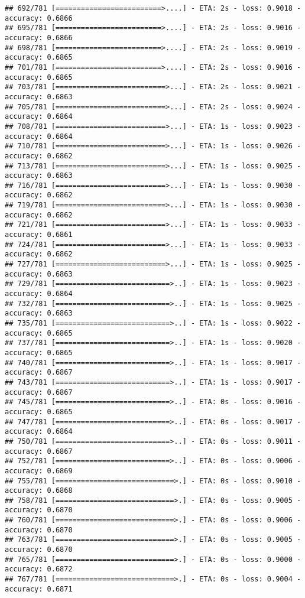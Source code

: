 \documentclass[
]{article}
\begin{document}
\begin{verbatim}
## 692/781 [=========================>....] - ETA: 2s - loss: 0.9018 - accuracy: 0.6866
## 695/781 [=========================>....] - ETA: 2s - loss: 0.9016 - accuracy: 0.6866
## 698/781 [=========================>....] - ETA: 2s - loss: 0.9019 - accuracy: 0.6865
## 701/781 [=========================>....] - ETA: 2s - loss: 0.9016 - accuracy: 0.6865
## 703/781 [==========================>...] - ETA: 2s - loss: 0.9021 - accuracy: 0.6863
## 705/781 [==========================>...] - ETA: 2s - loss: 0.9024 - accuracy: 0.6864
## 708/781 [==========================>...] - ETA: 1s - loss: 0.9023 - accuracy: 0.6864
## 710/781 [==========================>...] - ETA: 1s - loss: 0.9026 - accuracy: 0.6862
## 713/781 [==========================>...] - ETA: 1s - loss: 0.9025 - accuracy: 0.6863
## 716/781 [==========================>...] - ETA: 1s - loss: 0.9030 - accuracy: 0.6862
## 719/781 [==========================>...] - ETA: 1s - loss: 0.9030 - accuracy: 0.6862
## 721/781 [==========================>...] - ETA: 1s - loss: 0.9033 - accuracy: 0.6861
## 724/781 [==========================>...] - ETA: 1s - loss: 0.9033 - accuracy: 0.6862
## 727/781 [==========================>...] - ETA: 1s - loss: 0.9025 - accuracy: 0.6863
## 729/781 [===========================>..] - ETA: 1s - loss: 0.9023 - accuracy: 0.6864
## 732/781 [===========================>..] - ETA: 1s - loss: 0.9025 - accuracy: 0.6863
## 735/781 [===========================>..] - ETA: 1s - loss: 0.9022 - accuracy: 0.6865
## 737/781 [===========================>..] - ETA: 1s - loss: 0.9020 - accuracy: 0.6865
## 740/781 [===========================>..] - ETA: 1s - loss: 0.9017 - accuracy: 0.6867
## 743/781 [===========================>..] - ETA: 1s - loss: 0.9017 - accuracy: 0.6867
## 745/781 [===========================>..] - ETA: 0s - loss: 0.9016 - accuracy: 0.6865
## 747/781 [===========================>..] - ETA: 0s - loss: 0.9017 - accuracy: 0.6864
## 750/781 [===========================>..] - ETA: 0s - loss: 0.9011 - accuracy: 0.6867
## 752/781 [===========================>..] - ETA: 0s - loss: 0.9006 - accuracy: 0.6869
## 755/781 [============================>.] - ETA: 0s - loss: 0.9010 - accuracy: 0.6868
## 758/781 [============================>.] - ETA: 0s - loss: 0.9005 - accuracy: 0.6870
## 760/781 [============================>.] - ETA: 0s - loss: 0.9006 - accuracy: 0.6870
## 763/781 [============================>.] - ETA: 0s - loss: 0.9005 - accuracy: 0.6870
## 765/781 [============================>.] - ETA: 0s - loss: 0.9000 - accuracy: 0.6872
## 767/781 [============================>.] - ETA: 0s - loss: 0.9004 - accuracy: 0.6871

\end{verbatim}
\end{document}
